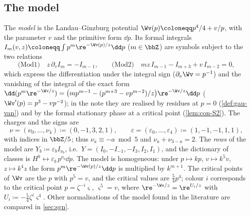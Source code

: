 
\subsection{The model}
\label{sec:set-model}

\begin{defn}
\label{def:set-model}
The \emph{model} is the Landau--Ginzburg potential $\Wv(p)\coloneqq p^4/4+v/p$, with the parameter $v$ and the primitive form $\dd p$. Its formal integrals $I_m(v,z)\coloneqq\int p^m\re^{-\Wv(p)/z}\dd p$ ($m\in\bbZ$) are symbols subject to the two relations
\[
\text{(Mod1)}\quad z\,\partial_vI_m=-I_{m-1},\qquad\text{(Mod2)}\quad mz\,I_{m-1}-I_{m+3}+v\,I_{m-2}=0,
\]
which express the differentiation under the integral sign ($\partial_v\Wv=p^{-1}$) and the vanishing of the integral of the exact form $\dd(p^m\re^{-\Wv/z})=\bigl(mp^{m-1}-(p^{m+3}-vp^{m-2})/z\bigr)\re^{-\Wv/z}\dd p$ ($\Wv'(p)=p^3-vp^{-2}$); in the note they are realised by residues at $p=0$ (\cref{def:gau-van}) and by the formal stationary phase at a critical point (\cref{lem:con-S2}). The charges and the signs are
\[
\nu=(\nu_0,\dots,\nu_4)\coloneqq(0,-1,3,2,1),\qquad\varepsilon=(\varepsilon_0,\dots,\varepsilon_4)\coloneqq(1,-1,-1,1,1),
\]
with indices in $\bbZ/5$; thus $\nu_a\equiv-a\bmod5$ and $\nu_a+\nu_{3-a}=2$. The \emph{rows} of the model are $Y_b\coloneqq\varepsilon_bI_{\nu_b}$, i.e.\ $Y=(I_0,-I_{-1},-I_3,I_2,I_1)$, and the dictionary of classes is $H^b\leftrightarrow\varepsilon_b\,p^{\nu_b}\dd p$. The model is homogeneous: under $p\mapsto kp$, $v\mapsto k^5v$, $z\mapsto k^4z$ the form $p^m\re^{-\Wv(p)/z}\dd p$ is multiplied by $k^{m+1}$. The critical points of $\Wv$ are the $p$ with $p^5=v$, and the critical values are $\frac54p^4$; colour $i$ corresponds to the critical point $p=\zeta^{-i}\varsigma$, $\varsigma^5=v$, where $\re^{-\Wv/z}=\re^{U_i/z}$ with $U_i\coloneqq-\frac54\zeta^i\varsigma^4$. Other normalisations of the model found in the literature are compared in \cref{sec:sgn}.
\end{defn}

